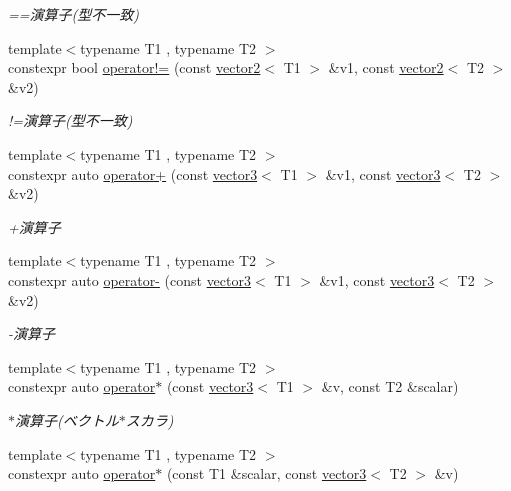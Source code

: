 \begin{DoxyCompactItemize}
\begin{DoxyCompactList}\small\item\em ==演算子(型不一致) \end{DoxyCompactList}\item 
{\footnotesize template$<$typename T1 , typename T2 $>$ }\\constexpr bool \mbox{\hyperlink{namespacesaki_a0d7159e145464e2deab2de2a76be1c00}{operator!=}} (const \mbox{\hyperlink{classsaki_1_1vector2}{vector2}}$<$ T1 $>$ \&v1, const \mbox{\hyperlink{classsaki_1_1vector2}{vector2}}$<$ T2 $>$ \&v2)
\begin{DoxyCompactList}\small\item\em !=演算子(型不一致) \end{DoxyCompactList}\item 
{\footnotesize template$<$typename T1 , typename T2 $>$ }\\constexpr auto \mbox{\hyperlink{namespacesaki_af2eb9872710ab7ebca5e7a665f1a7cd7}{operator+}} (const \mbox{\hyperlink{classsaki_1_1vector3}{vector3}}$<$ T1 $>$ \&v1, const \mbox{\hyperlink{classsaki_1_1vector3}{vector3}}$<$ T2 $>$ \&v2)
\begin{DoxyCompactList}\small\item\em +演算子 \end{DoxyCompactList}\item 
{\footnotesize template$<$typename T1 , typename T2 $>$ }\\constexpr auto \mbox{\hyperlink{namespacesaki_a8697755777c25ac12687ea8804f80331}{operator-\/}} (const \mbox{\hyperlink{classsaki_1_1vector3}{vector3}}$<$ T1 $>$ \&v1, const \mbox{\hyperlink{classsaki_1_1vector3}{vector3}}$<$ T2 $>$ \&v2)
\begin{DoxyCompactList}\small\item\em -\/演算子 \end{DoxyCompactList}\item 
{\footnotesize template$<$typename T1 , typename T2 $>$ }\\constexpr auto \mbox{\hyperlink{namespacesaki_abd9716c5a5ccdc1cafb975df8897acb3}{operator$\ast$}} (const \mbox{\hyperlink{classsaki_1_1vector3}{vector3}}$<$ T1 $>$ \&v, const T2 \&scalar)
\begin{DoxyCompactList}\small\item\em $\ast$演算子(ベクトル$\ast$スカラ) \end{DoxyCompactList}\item 
{\footnotesize template$<$typename T1 , typename T2 $>$ }\\constexpr auto \mbox{\hyperlink{namespacesaki_ab3e41594237dcaac47a2a27ed97f48f6}{operator$\ast$}} (const T1 \&scalar, const \mbox{\hyperlink{classsaki_1_1vector3}{vector3}}$<$ T2 $>$ \&v)

\end{DoxyCompactItemize}
